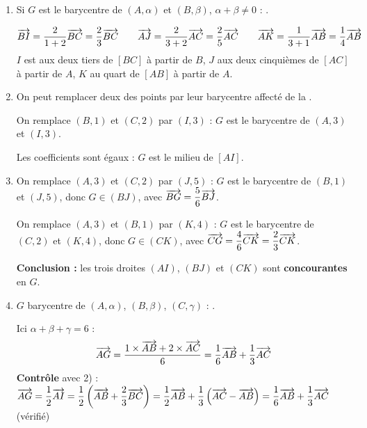 \begin{center}
\end{center}
\begin{enumerate}[itemsep=14pt]
  \item
  \begin{prop}
  Si $G$ est le barycentre de $(A,\alpha)$ et $(B,\beta)$, $\alpha+\beta\neq0$ : .
  \end{prop}
  \[\overrightarrow{BI}=\dfrac{2}{1+2}\overrightarrow{BC}=\dfrac23\overrightarrow{BC}\qquad\overrightarrow{AJ}=\dfrac{2}{3+2}\overrightarrow{AC}=\dfrac25\overrightarrow{AC}\qquad\overrightarrow{AK}=\dfrac{1}{3+1}\overrightarrow{AB}=\dfrac14\overrightarrow{AB}\]
  $I$ est aux deux tiers de $[BC]$ à partir de $B$, $J$ aux deux cinquièmes de $[AC]$ à partir de $A$, $K$ au quart de $[AB]$ à partir de $A$.

  \item
  \begin{prop}
  On peut remplacer deux des points par leur barycentre affecté de la .
  \end{prop}
  On remplace $(B,1)$ et $(C,2)$ par $(I,3)$ : $G$ est le barycentre de $(A,3)$ et $(I,3)$.

  Les coefficients sont égaux : $G$ est le milieu de $[AI]$.

  \item On remplace $(A,3)$ et $(C,2)$ par $(J,5)$ : $G$ est le barycentre de $(B,1)$ et $(J,5)$, donc $G\in(BJ)$, avec $\overrightarrow{BG}=\dfrac56\overrightarrow{BJ}$.

  On remplace $(A,3)$ et $(B,1)$ par $(K,4)$ : $G$ est le barycentre de $(C,2)$ et $(K,4)$, donc $G\in(CK)$, avec $\overrightarrow{CG}=\dfrac46\overrightarrow{CK}=\dfrac23\overrightarrow{CK}$.

  \textbf{Conclusion :} les trois droites $(AI)$, $(BJ)$ et $(CK)$ sont \textbf{concourantes} en $G$.

  \item
  \begin{prop}
  $G$ barycentre de $(A,\alpha)$, $(B,\beta)$, $(C,\gamma)$ : .
  \end{prop}
  Ici $\alpha+\beta+\gamma=6$ :
  \[\overrightarrow{AG}=\dfrac{1\times\overrightarrow{AB}+2\times\overrightarrow{AC}}{6}=\dfrac16\overrightarrow{AB}+\dfrac13\overrightarrow{AC}\]
  \textbf{Contrôle} avec 2) : $\overrightarrow{AG}=\dfrac12\overrightarrow{AI}=\dfrac12\left(\overrightarrow{AB}+\dfrac23\overrightarrow{BC}\right)=\dfrac12\overrightarrow{AB}+\dfrac13\left(\overrightarrow{AC}-\overrightarrow{AB}\right)=\dfrac16\overrightarrow{AB}+\dfrac13\overrightarrow{AC}$ (vérifié)
\end{enumerate}
